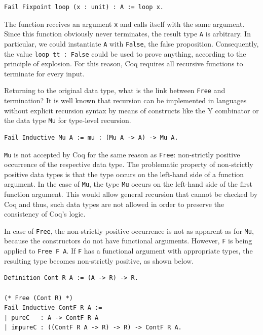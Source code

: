 \documentclass[a4paper, 11pt, fleqn, twoside, abstract=on]{scrreprt}
\newcommand{\cinl}[1]{\texttt{#1}}
\begin{document}
\begin{verbatim}
Fail Fixpoint loop (x : unit) : A := loop x.
\end{verbatim}

The function receives an argument \cinl{x} and calls itself with the same argument.
Since this function obviously never terminates, the result type \cinl{A} is arbitrary.
In particular, we could instantiate \cinl{A} with \cinl{False}, the false proposition.
Consequently, the value \cinl{loop tt : False} could be used to prove anything, according to the principle of explosion.
For this reason, Coq requires all recursive functions to terminate for every input.

Returning to the original data type, what is the link between \cinl{Free} and termination?
It is well known that recursion can be implemented in languages without explicit recursion syntax by means of constructs like the Y combinator or the data type \texttt{Mu} for type-level recursion.

\begin{verbatim}
Fail Inductive Mu A := mu : (Mu A -> A) -> Mu A.
\end{verbatim}

\cinl{Mu} is not accepted by Coq for the same reason as \cinl{Free}: non-strictly positive occurrence of the respective data type.
The problematic property of non-strictly positive data types is that the type occurs on the left-hand side of a function argument.
In the case of \cinl{Mu}, the type \cinl{Mu} occurs on the left-hand side of the first function argument.
This would allow general recursion that cannot be checked by Coq and thus, such data types are not allowed in order to preserve the consistency of Coq's logic.

In case of \cinl{Free}, the non-strictly positive occurrence is not as apparent as for \cinl{Mu}, because the constructors do not have functional arguments.
However, \cinl{F} is being applied to \texttt{Free F A}.
If \texttt{F} has a functional argument with appropriate types, the resulting type becomes non-strictly positive, as shown below.

\begin{verbatim}
Definition Cont R A := (A -> R) -> R.

(* Free (Cont R) *)
Fail Inductive ContF R A :=
| pureC   : A -> ContF R A
| impureC : ((ContF R A -> R) -> R) -> ContF R A.
\end{verbatim}
\end{document}
